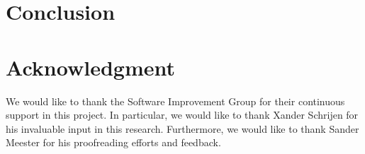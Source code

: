 \documentclass[sigconf,review]{acmart}
\begin{document}
\section{Conclusion}

\section*{Acknowledgment}
We would like to thank the Software Improvement Group for their continuous support in this project. In particular, we would like to thank Xander Schrijen for his invaluable input in this research. Furthermore, we would like to thank Sander Meester for his proofreading efforts and feedback.



\end{document}
